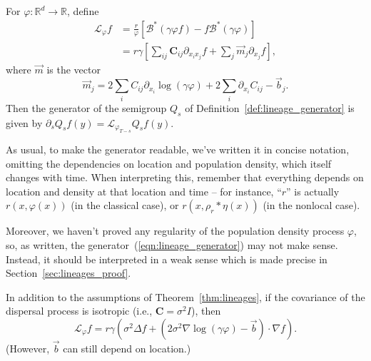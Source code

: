 \documentclass[EJP]{ejpecp} %
\newcommand{\IR}{\mathbb R}
\newcommand{\grad}{\nabla}
\newcommand{\DG}{\mathcal{B}}  %
\newcommand{\meanq}{\vec b}    %
\newcommand{\covq}{\mathbf{C}}     %
\newcommand{\kernel}{\rho}  %
\newcommand{\smooth}[1]{\kernel_{#1} \! * \!}  %
\newcommand{\Lgen}{\mathcal{L}}    %
\begin{document}
\begin{theorem} \label{thm:lineages}
    For $\varphi: \IR^d \to \IR$, define
    \begin{align}
        \label{eqn:lineage_generator}
        \Lgen_\varphi f
        &=
        \frac{r}{\varphi}
        \left[
            \DG^*(\gamma \varphi f) 
            - f \DG^* (\gamma \varphi)
        \right] \\
        &= \label{eqn:lineage_generator2}
        r\gamma
        \left[
            \sum_{ij} \covq_{ij} \partial_{x_ix_j} f
            + \sum_j \vec{m}_j \partial_{x_j} f
        \right] ,
    \end{align}
    where $\vec{m}$ is the vector
    $$
    \vec{m}_j
    =
    2 \sum_i C_{ij} \partial_{x_i} \log(\gamma \varphi)
    + 2 \sum_i \partial_{x_i} C_{ij}
    - \meanq_j .
    $$
    Then the generator of the semigroup $Q_s$
    of Definition~\ref{def:lineage_generator} is given by
	$\partial_sQ_sf(y)= \Lgen_{\varphi_{T-s}}Q_sf(y).$ 
\end{theorem}
\begin{remark}
As usual,
to make the generator readable, we've written it in concise notation,
omitting the dependencies on location and population density,
which itself changes with time.
When interpreting this,
remember that everything depends on location and density at that location and time --
for instance, ``$r$'' is actually $r(x, \varphi(x))$ (in the classical case),
or $r(x, \smooth{r} \eta(x))$ (in the nonlocal case).

Moreover, we haven't proved any regularity of the population density process $\varphi$,
so, as written, the generator~(\ref{eqn:lineage_generator})
may not make sense. Instead, it should be interpreted in a weak sense which is made precise
in Section~\ref{sec:lineages_proof}.
\end{remark}

\begin{corollary} \label{cor:lineages_simple}
    In addition to the assumptions of Theorem~\ref{thm:lineages},
    if the covariance of the dispersal process is isotropic
    (i.e., $\covq = \sigma^2 I$),
    then
    \begin{equation}
        \Lgen_\varphi f
        =
        r \gamma
        \left(
            \sigma^2 \Delta f
            +
            \left(
                2 \sigma^2 \grad \log(\gamma \varphi)
                - \meanq
            \right)
            \cdot \grad f
        \right) .
    \end{equation}
    (However, $\meanq$ can still depend on location.)
\end{corollary}
\end{document}
